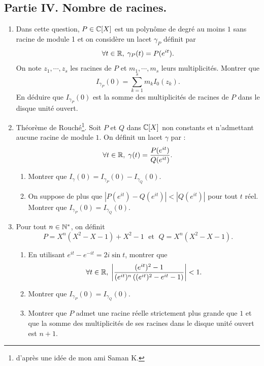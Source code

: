\subsection*{Partie IV. Nombre de racines.}
\begin{enumerate}
 \item Dans cette question, $P\in \mathbb{C}[X]$ est un polynôme de degré au moins $1$ sans racine de module 1 et on considère un lacet $\gamma_P$ définit par 
\[
 \forall t \in \mathbb{R}, \; \gamma_P(t) = P(e^{it}).
\]
On note $z_1, \cdots, z_s$ les racines de $P$ et $m_1, \cdots, m_s$ leurs multiplicités.\newline
Montrer que
\[
 I_{{\gamma}_P}(0) = \sum_{k=1}^{s}m_kI_0(z_k).
\]
En déduire que $I_{\gamma_P}(0)$ est la somme des multiplicités de racines de $P$ dans le disque unité ouvert.

 \item Théorème de Rouché\footnote{d'après une idée de mon ami Saman K.}.\newline
 Soit $P$ et $Q$ dans $\mathbb{C}[X]$ non constants et n'admettant aucune racine de module $1$. On définit un lacet $\gamma$ par :
\[
 \forall t \in \mathbb{R}, \; \gamma(t) = \frac{P(e^{it})}{Q(e^{it})}.
\]

\begin{enumerate}
  \item Montrer que $I_\gamma(0) = I_{\gamma_P}(0) - I_{\gamma_Q}(0)$.
  \item On suppose de plus que $\left|P(e^{it}) - Q(e^{it})\right| < \left| Q(e^{it}) \right|$ pour tout $t$ réel.\newline
 Montrer que $I_{\gamma_P}(0) = I_{\gamma_Q}(0)$.
\end{enumerate}

 \item Pour tout $n\in \mathbb{N}^*$, on définit
\[
 P = X^n(X^2 - X - 1) + X^2 -1 \; \text{ et } \; Q = X^n(X^2 - X - 1).
\]
\begin{enumerate}
 \item En utilisant $e^{it} - e^{-it} = 2i \sin t$, montrer que 
\[
 \forall t \in \mathbb{R}, \; \left| \frac{(e^{it})^2 - 1}{(e^{it})^n\left( (e^{it})^2 - e^{it} - 1\right) }\right| < 1.
\]
  \item Montrer que $I_{\gamma_P}(0) = I_{\gamma_Q}(0)$.
  \item Montrer que $P$ admet une racine réelle strictement plus grande que $1$ et que la somme des multiplicités de ses racines dans le disque unité ouvert est $n+1$.
\end{enumerate}
\end{enumerate}

